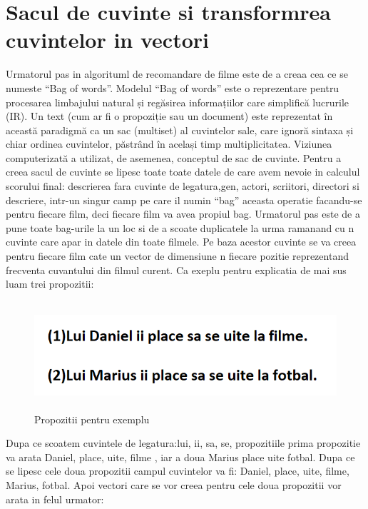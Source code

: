 \section{Sacul de cuvinte si transformrea cuvintelor in vectori }
\par Urmatorul pas in algorituml de recomandare de filme este de a creaa cea ce se numeste “Bag of words”. Modelul “Bag of words” este o reprezentare pentru procesarea limbajului natural și regăsirea informațiilor care simplifică lucrurile (IR). Un text (cum ar fi o propoziție sau un document) este reprezentat în această paradigmă ca un sac (multiset) al cuvintelor sale, care ignoră sintaxa și chiar ordinea cuvintelor, păstrând în același timp multiplicitatea. Viziunea computerizată a utilizat, de asemenea, conceptul de sac de cuvinte. Pentru a creea sacul de cuvinte se lipesc toate toate datele de care avem nevoie in calculul scorului final: descrierea fara cuvinte de legatura,gen, actori, scriitori, directori si descriere, intr-un singur camp pe care il numin “bag” aceasta operatie facandu-se pentru fiecare film, deci fiecare film va avea propiul bag. Urmatorul pas este de a pune toate bag-urile la un loc si de a scoate duplicatele la urma ramanand cu n cuvinte care apar in datele din toate filmele.  Pe baza acestor cuvinte se va creea pentru fiecare film cate un vector de dimensiune n fiecare pozitie reprezentand frecventa cuvantului din filmul curent. Ca exeplu pentru explicatia de mai sus luam trei propozitii: 
		\begin{figure}[htbp]
			\centerline{\includegraphics[width=16cm, height=4cm]{figures/cele 2 poze.png}}
			\caption{Propozitii pentru exemplu}
			\label{fig}
		\end{figure}
\par Dupa ce scoatem cuvintele de legatura:lui, ii, sa, se, propozitiile prima propozitie va arata Daniel, place, uite, filme , iar a doua Marius place uite fotbal. Dupa ce se lipesc cele doua propozitii campul cuvintelor va fi: Daniel, place, uite, filme, Marius, fotbal. Apoi vectori care se vor creea pentru cele doua propozitii vor arata in felul urmator: 

